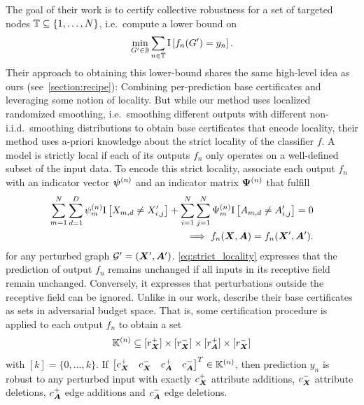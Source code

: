 The goal of their work is to certify collective robustness for a set of targeted nodes ${\mathbb{T}} \subseteq \{1,\dots,  N\}$, i.e.~compute a lower bound on
\begin{equation}
    \min_{G' \in {\mathbb{B}}} \sum_{n \in {\mathbb{T}}} \mathrm{I}\left[f_n(G') = {y}_n\right].
\end{equation}
Their approach to obtaining this lower-bound shares the same high-level idea as ours (see~\autoref{section:recipe}): Combining per-prediction base certificates and leveraging some notion of locality.
But while our method uses localized randomized smoothing, i.e.~smoothing different outputs with different non-i.i.d.\ smoothing distributions to obtain base certificates that encode locality, their method uses a-priori knowledge about the strict locality of the classifier $f$.
A model is strictly local if each of its outputs $f_n$ only operates on a well-defined subset of the input data.
To encode this strict locality, \citet{Schuchardt2021} associate each output $f_n$ with an indicator vector ${\bm{\psi}}^{(n)}$ and an indicator matrix ${\bm{\Psi}}^{(n)}$ that fulfill
\begin{equation}\label{eq:strict_locality}
    \begin{split}
    \sum_{m=1}^N \sum_{d=1}^D {\psi}^{(n)}_m \mathrm{I}\left[{X}_{m,d} \neq {X}'_{i,j}\right]
    +
    \sum_{i=1}^N \sum_{j=1}^N {\Psi}^{(n)}_m \mathrm{I}\left[{A}_{m,d} \neq {A}'_{i,j}\right]
    = 0
    \\
    \implies f_n({\bm{X}}, {\bm{A}}) = f_n({\bm{X}}', {\bm{A}}').
    \end{split}
\end{equation}
for any perturbed graph ${\mathcal{G}}' = \left({\bm{X}}', {\bm{A}}'\right)$. \autoref{eq:strict_locality} expresses that the prediction of output $f_n$ remains unchanged if all inputs in its receptive field remain unchanged. Conversely, it expresses that perturbations outside the receptive field can be ignored.
Unlike in our work, \citet{Schuchardt2021} describe their base certificates as sets in adversarial budget space. That is, some certification procedure is applied to each output $f_n$ to obtain a set
\begin{equation}
    {\mathbb{K}}^{(n)} \subseteq [r_{\bm{X}}^{+}] \times [r_{\bm{X}}^{-}] \times [r_{\bm{A}}^{+}] \times [r_{\bm{X}}^{-}]
\end{equation}
with $[k] = \{0, \dots, k\}$.
If
$\begin{bmatrix} c_{\bm{X}}^{+} &  c_{\bm{X}}^{-} & c_{\bm{A}}^{+} &  c_{\bm{A}}^{-}\end{bmatrix}^T \in {\mathbb{K}}^{(n)}$, then prediction $y_n$ is robust to any perturbed input with exactly $c_{\bm{X}}^{+}$ attribute additions,  $c_{\bm{X}}^{-}$ attribute deletions, $c_{\bm{A}}^{+}$ edge additions and $c_{\bm{A}}^{-}$ edge deletions.
